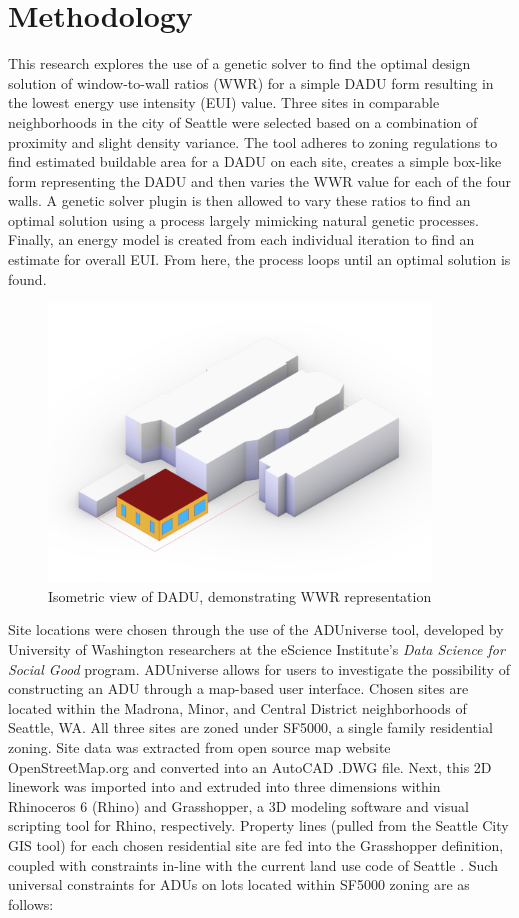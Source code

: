 \documentclass[sagev,times,Review,doublespace]{sagej}
\begin{document}
\section{Methodology} 
This research explores the use of a genetic solver to find the optimal design solution of window-to-wall ratios (WWR) for a simple DADU form resulting in the lowest energy use intensity (EUI) value. Three sites in comparable neighborhoods in the city of Seattle were selected based on a combination of proximity and slight density variance. The tool adheres to zoning regulations to find estimated buildable area for a DADU on each site, creates a simple box-like form representing the DADU and then varies the WWR value for each of the four walls. A genetic solver plugin is then allowed to vary these ratios to find an optimal solution using a process largely mimicking natural genetic processes. Finally, an energy model is created from each individual iteration to find an estimate for overall EUI. From here, the process loops until an optimal solution is found.

\begin{figure}[h!]
\centering
\includegraphics[width=4in]{3d-view.png}
\caption{Isometric view of DADU, demonstrating WWR representation}
\label{3d-view}
\end{figure}

Site locations were chosen through the use of the ADUniverse tool, developed by University of Washington researchers at the eScience Institute's \textit{Data Science for Social Good} program\cite{ADUniverseToolEScience}. ADUniverse allows for users to investigate the possibility of constructing an ADU through a map-based user interface. Chosen sites are located within the Madrona, Minor, and Central District neighborhoods of Seattle, WA. All three sites are zoned under SF5000, a single family residential zoning. Site data was extracted from open source map website OpenStreetMap.org and converted into an AutoCAD .DWG file. Next, this 2D linework was imported into and extruded into three dimensions within Rhinoceros 6 (Rhino) and Grasshopper, a 3D modeling software and visual scripting tool for Rhino, respectively. Property lines (pulled from the Seattle City GIS tool) for each chosen residential site are fed into the Grasshopper definition, coupled with constraints in-line with the current land use code of Seattle \cite{SeattleLandUse2021}. Such universal constraints for ADUs on lots located within SF5000 zoning are as follows\cite{ADUniverseADURules}: 
\end{document}

